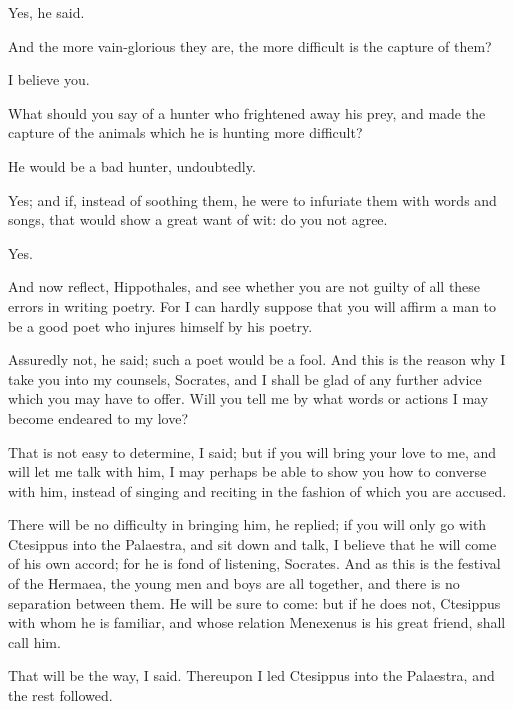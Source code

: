 \documentclass[11pt,letter]{article}
\begin{document}
\par  Yes, he said.

\par  And the more vain-glorious they are, the more difficult is the capture of them?

\par  I believe you.

\par  What should you say of a hunter who frightened away his prey, and made the capture of the animals which he is hunting more difficult?

\par  He would be a bad hunter, undoubtedly.

\par  Yes; and if, instead of soothing them, he were to infuriate them with words and songs, that would show a great want of wit: do you not agree.

\par  Yes.

\par  And now reflect, Hippothales, and see whether you are not guilty of all these errors in writing poetry. For I can hardly suppose that you will affirm a man to be a good poet who injures himself by his poetry.

\par  Assuredly not, he said; such a poet would be a fool. And this is the reason why I take you into my counsels, Socrates, and I shall be glad of any further advice which you may have to offer. Will you tell me by what words or actions I may become endeared to my love?

\par  That is not easy to determine, I said; but if you will bring your love to me, and will let me talk with him, I may perhaps be able to show you how to converse with him, instead of singing and reciting in the fashion of which you are accused.

\par  There will be no difficulty in bringing him, he replied; if you will only go with Ctesippus into the Palaestra, and sit down and talk, I believe that he will come of his own accord; for he is fond of listening, Socrates. And as this is the festival of the Hermaea, the young men and boys are all together, and there is no separation between them. He will be sure to come: but if he does not, Ctesippus with whom he is familiar, and whose relation Menexenus is his great friend, shall call him.

\par  That will be the way, I said. Thereupon I led Ctesippus into the Palaestra, and the rest followed.
\end{document}
